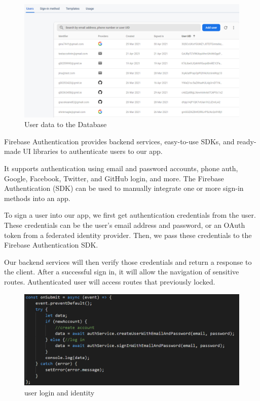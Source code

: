 \begin{figure}
    \centering
    \includegraphics[scale=0.5]{img/auth.PNG}
    \caption{User data to the Database}
    \label{fig:my_label4}
\end{figure}

Firebase Authentication provides backend services, easy-to-use SDKs, and ready-made UI libraries to authenticate users to our app.

It supports authentication using email and password accounts, phone auth, Google, Facebook, Twitter, and GitHub login, and more. The Firebase Authentication (SDK) can be used to manually integrate one or more sign-in methods into an app.

To sign a user into our app, we first get authentication credentials from the user. 
These credentials can be the user's email address and password, or an OAuth token from a federated identity provider. Then, we pass these credentials to the Firebase Authentication SDK. 

Our backend services will then verify those credentials and return a response to the client.
After a successful sign in, it will allow the navigation of sensitive routes.
Authenticated user will access routes that previously locked.

\begin{figure}
    \centering
    \includegraphics[scale=0.55]{img/login.PNG}
    \caption{user login and identity}
    \label{fig:my_label4}
\end{figure}



